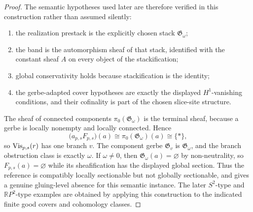 \begin{proof}
The semantic hypotheses used later are therefore verified in this construction rather than assumed silently:
\begin{enumerate}[label=(\alph*),nosep]
\item the realization prestack is the explicitly chosen stack $\mathfrak G_\omega$;
\item the band is the automorphism sheaf of that stack, identified with the constant sheaf $A$ on every object of the stackification;
\item global conservativity holds because stackification is the identity;
\item the gerbe-adapted cover hypotheses are exactly the displayed $H^1$-vanishing conditions, and their cofinality is part of the chosen slice-site structure.
\end{enumerate}

The sheaf of connected components $\pi_0(\mathfrak G_\omega)$ is the terminal sheaf, because a gerbe is locally nonempty and locally connected. Hence
\[
\bigl(a_{p,s}F_{p,s}\bigr)(a)\cong \pi_0(\mathfrak G_\omega)(a)\cong \{*\},
\]
so $\mathrm{Vis}_{p,s}(r)$ has one branch $v$. The component gerbe $\mathfrak G_v$ is
$\mathfrak G_\omega$, and the branch obstruction class is exactly $\omega$. If
$\omega\neq 0$, then $\mathfrak G_\omega(a)=\varnothing$ by non-neutrality, so
$F_{p,s}(a)=\varnothing$ while its sheafification has the displayed global
section. Thus the reference is compatibly locally sectionable but not globally
sectionable, and  gives a genuine gluing-level
absence for this semantic instance. The later $S^2$-type and
$\mathbb{R}P^2$-type examples are obtained by applying this construction to the
indicated finite good covers and cohomology classes.
\end{proof}

